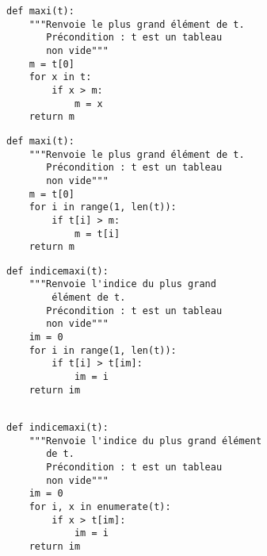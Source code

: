 \begin{lstlisting}
def maxi(t):
    """Renvoie le plus grand élément de t.
       Précondition : t est un tableau 
       non vide"""
    m = t[0]
    for x in t:
        if x > m:
            m = x 
    return m
\end{lstlisting}


\begin{lstlisting}
def maxi(t):
    """Renvoie le plus grand élément de t.
       Précondition : t est un tableau 
       non vide"""
    m = t[0] 
    for i in range(1, len(t)):
        if t[i] > m:
            m = t[i] 
    return m
\end{lstlisting}


\begin{lstlisting}
def indicemaxi(t):
    """Renvoie l'indice du plus grand 
        élément de t.
       Précondition : t est un tableau 
       non vide"""
    im = 0 
    for i in range(1, len(t)):
        if t[i] > t[im]:
            im = i 
    return im
    
\end{lstlisting}



\begin{lstlisting}
def indicemaxi(t):
    """Renvoie l'indice du plus grand élément 
       de t.
       Précondition : t est un tableau 
       non vide"""
    im = 0 
    for i, x in enumerate(t):
        if x > t[im]:
            im = i 
    return im
\end{lstlisting}